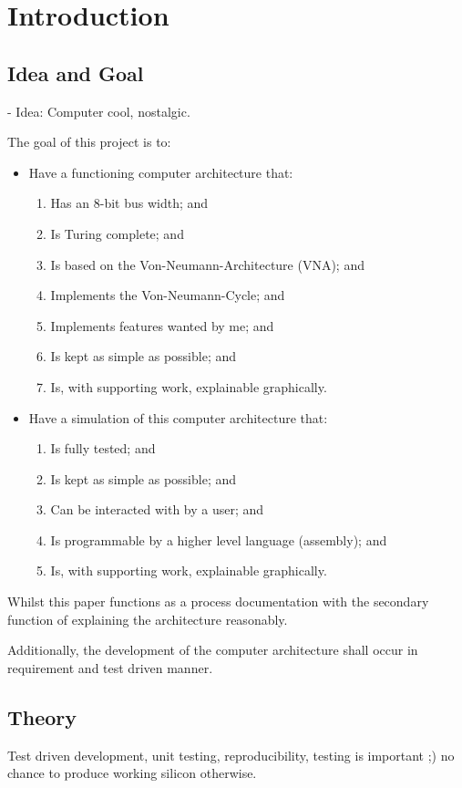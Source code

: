 \chapter{Introduction}

\section{Idea and Goal} \label{goals}
- Idea: Computer cool, nostalgic. 

The goal of this project is to: 
\begin{itemize}
  \item Have a functioning computer architecture that:
 \begin{enumerate}
    \item Has an 8-bit bus width; and
    \item Is Turing complete; and
    \item Is based on the Von-Neumann-Architecture (VNA); and
    \item Implements the Von-Neumann-Cycle; and
    \item Implements features wanted by me; and  
    \item Is kept as simple as possible; and
    \item Is, with supporting work, explainable graphically.
  \end{enumerate}
  \item Have a simulation of this computer architecture that: 
  \begin{enumerate}
    \item Is fully tested; and
    \item Is kept as simple as possible; and
    \item Can be interacted with by a user; and
    \item Is programmable by a higher level language (assembly); and
    \item Is, with supporting work, explainable graphically.
  \end{enumerate}
\end{itemize}

Whilst this paper functions as a process documentation with the secondary function of explaining the architecture reasonably.
  
Additionally, the development of the computer architecture shall occur in requirement and test driven manner. 

\section{Theory}
Test driven development, unit testing, reproducibility, testing is important ;) no chance to produce working silicon otherwise.

